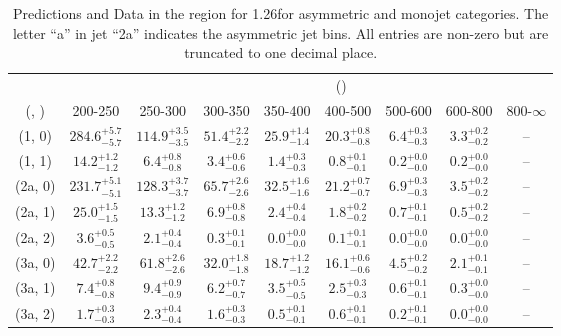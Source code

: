 \begin{table}[h!]
\tiny
\centering
\caption{Predictions and Data in the \mmj region for 1.26\ifb for asymmetric and monojet categories. The letter ``a'' in jet \eg ``2a''  indicates the asymmetric jet bins. All entries are non-zero but are truncated to one decimal place.\label{tab:yieldsseppost_mumu_ewk_asym}}
\begin{tabular}
{ccccccccc}
	\hline\hline
&	& \multicolumn{8}{c}{\scalht (\gev)} \\ 
	 (\njet,  \nb) & 200-250 & 250-300 & 300-350 & 350-400 & 400-500 & 500-600 & 600-800 & 800-$\infty$ \\ [0.8ex] 
\hline
	(1, 0) & $284.6^{+ 5.7 }_{- 5.7 }$ & $114.9^{+ 3.5 }_{- 3.5 }$ & $51.4^{+ 2.2 }_{- 2.2 }$ & $25.9^{+ 1.4 }_{- 1.4 }$ & $20.3^{+ 0.8 }_{- 0.8 }$ & $6.4^{+ 0.3 }_{- 0.3 }$ & $3.3^{+ 0.2 }_{- 0.2 }$ & -- \\[0.5ex] 
	(1, 1) & $14.2^{+ 1.2 }_{- 1.2 }$ & $6.4^{+ 0.8 }_{- 0.8 }$ & $3.4^{+ 0.6 }_{- 0.6 }$ & $1.4^{+ 0.3 }_{- 0.3 }$ & $0.8^{+ 0.1 }_{- 0.1 }$ & $0.2^{+ 0.0 }_{- 0.0 }$ & $0.2^{+ 0.0 }_{- 0.0 }$ & -- \\[0.5ex] 
	(2a, 0) & $231.7^{+ 5.1 }_{- 5.1 }$ & $128.3^{+ 3.7 }_{- 3.7 }$ & $65.7^{+ 2.6 }_{- 2.6 }$ & $32.5^{+ 1.6 }_{- 1.6 }$ & $21.2^{+ 0.7 }_{- 0.7 }$ & $6.9^{+ 0.3 }_{- 0.3 }$ & $3.5^{+ 0.2 }_{- 0.2 }$ & -- \\[0.5ex] 
	(2a, 1) & $25.0^{+ 1.5 }_{- 1.5 }$ & $13.3^{+ 1.2 }_{- 1.2 }$ & $6.9^{+ 0.8 }_{- 0.8 }$ & $2.4^{+ 0.4 }_{- 0.4 }$ & $1.8^{+ 0.2 }_{- 0.2 }$ & $0.7^{+ 0.1 }_{- 0.1 }$ & $0.5^{+ 0.2 }_{- 0.2 }$ & -- \\[0.5ex] 
	(2a, 2) & $3.6^{+ 0.5 }_{- 0.5 }$ & $2.1^{+ 0.4 }_{- 0.4 }$ & $0.3^{+ 0.1 }_{- 0.1 }$ & $0.0^{+ 0.0 }_{- 0.0 }$ & $0.1^{+ 0.1 }_{- 0.1 }$ & $0.0^{+ 0.0 }_{- 0.0 }$ & $0.0^{+ 0.0 }_{- 0.0 }$ & -- \\[0.5ex] 
	(3a, 0) & $42.7^{+ 2.2 }_{- 2.2 }$ & $61.8^{+ 2.6 }_{- 2.6 }$ & $32.0^{+ 1.8 }_{- 1.8 }$ & $18.7^{+ 1.2 }_{- 1.2 }$ & $16.1^{+ 0.6 }_{- 0.6 }$ & $4.5^{+ 0.2 }_{- 0.2 }$ & $2.1^{+ 0.1 }_{- 0.1 }$ & -- \\[0.5ex] 
	(3a, 1) & $7.4^{+ 0.8 }_{- 0.8 }$ & $9.4^{+ 0.9 }_{- 0.9 }$ & $6.2^{+ 0.7 }_{- 0.7 }$ & $3.5^{+ 0.5 }_{- 0.5 }$ & $2.5^{+ 0.3 }_{- 0.3 }$ & $0.6^{+ 0.1 }_{- 0.1 }$ & $0.3^{+ 0.0 }_{- 0.0 }$ & -- \\[0.5ex] 
	(3a, 2) & $1.7^{+ 0.3 }_{- 0.3 }$ & $2.3^{+ 0.4 }_{- 0.4 }$ & $1.6^{+ 0.3 }_{- 0.3 }$ & $0.5^{+ 0.1 }_{- 0.1 }$ & $0.6^{+ 0.1 }_{- 0.1 }$ & $0.2^{+ 0.1 }_{- 0.1 }$ & $0.0^{+ 0.0 }_{- 0.0 }$ & -- \\[0.5ex] 

\end{tabular}
\end{table}
